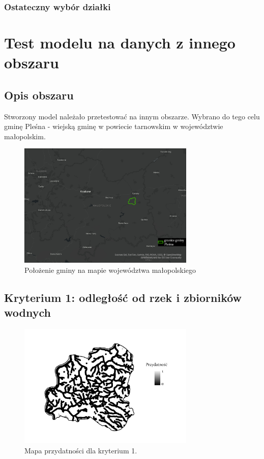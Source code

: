 \documentclass{article}
\begin{document}
\subsubsection{Ostateczny wybór działki}

\section{Test modelu na danych z innego obszaru}
\subsection{Opis obszaru}
Stworzony model należało przetestować na innym obszarze. Wybrano do tego celu gminę Pleśna - wiejską gminę w powiecie tarnowskim w województwie małopolskim.

\begin{figure}[H]
    \centering
    \includegraphics[width=0.75\textwidth]{img/plesna-polozenie.jpg}
    \caption*{Położenie gminy na mapie województwa małopolskiego}
\end{figure}

\subsection{Kryterium 1: odległość od rzek i zbiorników wodnych}
\begin{figure}[H]
    \centering
    \includegraphics[width=0.75\textwidth]{img/plesna-kryterium1-layout.jpg}
    \caption*{Mapa przydatności dla kryterium 1.}
\end{figure}
\end{document}
